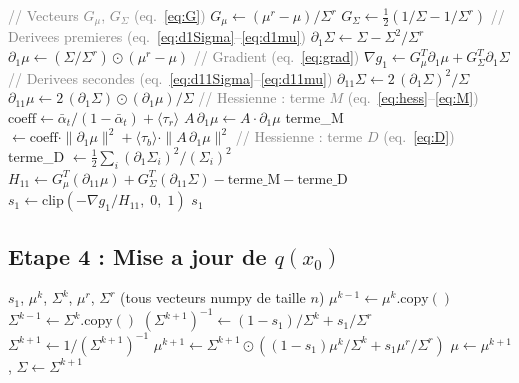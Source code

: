 \documentclass[12pt]{article}
\newcommand{\abar}{\bar{\alpha}}
\newcommand{\file}[1]{\texttt{\color{codeblue}#1}}
\newcommand{\func}[1]{\texttt{\color{codered}#1}}
\begin{document}
\begin{algorithm}[H]
\caption{Pas sous-optimal --- \file{emg\_vba\_1\_dim.py} $\to$ \func{calculer\_pas\_sousopt}}
\begin{algorithmic}[1]
\State \textcolor{gray}{// Vecteurs $G_\mu$, $G_\Sigma$ (eq.~\eqref{eq:G})}
\State $G_\mu \gets (\mu^r - \mu) / \Sigma^r$ 
\State $G_\Sigma \gets \frac{1}{2}\left(1/\Sigma - 1/\Sigma^r\right)$
\State
\State \textcolor{gray}{// Derivees premieres (eq.~\eqref{eq:d1Sigma}--\eqref{eq:d1mu})}
\State $\partial_1\Sigma \gets \Sigma - \Sigma^2 / \Sigma^r$
\State $\partial_1\mu \gets (\Sigma / \Sigma^r) \odot (\mu^r - \mu)$
\State
\State \textcolor{gray}{// Gradient (eq.~\eqref{eq:grad})}
\State $\nabla g_1 \gets G_\mu^T \partial_1\mu + G_\Sigma^T \partial_1\Sigma$ 
\State
\State \textcolor{gray}{// Derivees secondes (eq.~\eqref{eq:d11Sigma}--\eqref{eq:d11mu})}
\State $\partial_{11}\Sigma \gets 2\,(\partial_1\Sigma)^2 / \Sigma$
\State $\partial_{11}\mu \gets 2\,(\partial_1\Sigma) \odot (\partial_1\mu) / \Sigma$
\State
\State \textcolor{gray}{// Hessienne : terme $M$ (eq.~\eqref{eq:hess}--\eqref{eq:M})}
\State $\text{coeff} \gets \abar_t/(1-\abar_t) + \langle\tau_r\rangle$
\State $A\,\partial_1\mu \gets A \cdot \partial_1\mu$ 
\State terme\_M $\gets \text{coeff} \cdot \|\partial_1\mu\|^2 + \langle\tau_b\rangle \cdot \|A\,\partial_1\mu\|^2$
\State
\State \textcolor{gray}{// Hessienne : terme $D$ (eq.~\eqref{eq:D})}
\State terme\_D $\gets \frac{1}{2}\sum_i (\partial_1\Sigma_i)^2 / (\Sigma_i)^2$
\State
\State $H_{11} \gets G_\mu^T(\partial_{11}\mu) + G_\Sigma^T(\partial_{11}\Sigma) - \text{terme\_M} - \text{terme\_D}$
\State $s_1 \gets \text{clip}(-\nabla g_1 / H_{11},\; 0,\; 1)$ 
\Ensure $s_1$
\end{algorithmic}
\end{algorithm}

\subsection{Etape 4 : Mise a jour de $q(x_0)$}

\begin{algorithm}[H]
\caption{Mise a jour de $\mu$ et $\Sigma$ --- \file{emg\_vba\_1\_dim.py} $\to$ \func{mise\_a\_jour\_x0}}
\begin{algorithmic}[1]
\Require $s_1$, $\mu^k$, $\Sigma^k$, $\mu^r$, $\Sigma^r$ (tous vecteurs numpy de taille $n$)
\State $\mu^{k-1} \gets \mu^k.\text{copy}()$ 
\State $\Sigma^{k-1} \gets \Sigma^k.\text{copy}()$
\State
\State $(\Sigma^{k+1})^{-1} \gets (1-s_1)/\Sigma^k + s_1/\Sigma^r$ 
\State $\Sigma^{k+1} \gets 1/(\Sigma^{k+1})^{-1}$
\State $\mu^{k+1} \gets \Sigma^{k+1} \odot \left((1-s_1)\mu^k/\Sigma^k + s_1\mu^r/\Sigma^r\right)$ 
\State
\State $\mu \gets \mu^{k+1}$, \quad $\Sigma \gets \Sigma^{k+1}$
\end{algorithmic}
\end{algorithm}
\end{document}
